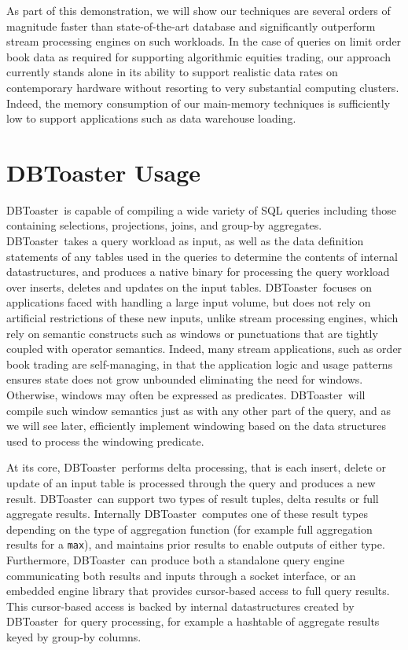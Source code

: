 \documentclass{vldb}
\newcommand{\compiler}{DBToaster}
\begin{document}
As part of this demonstration, we will show our techniques are several orders of
magnitude faster than state-of-the-art   database  and significantly outperform
stream processing engines on such workloads.  In the case of queries on limit
order  book  data  as  required for  supporting  algorithmic  equities trading,
our approach currently stands alone in its ability to support realistic  data
rates  on contemporary hardware without  resorting to very substantial computing
clusters. Indeed, the memory consumption of our main-memory techniques is
sufficiently low to support applications such as data warehouse loading.



\section{DBToaster Usage}

\compiler\ is capable of compiling a wide variety of SQL queries including those
containing selections, projections, joins, and group-by aggregates. \compiler\
takes a query workload as input, as well as the data definition statements of any
tables used in the queries to determine the contents of internal datastructures,
and produces a native binary for processing the query workload over inserts,
deletes and updates on the input tables. \compiler\ focuses on applications faced
with handling a large input volume, but does not rely on artificial restrictions
of these new inputs, unlike stream processing engines, which rely on semantic
constructs such as windows or punctuations that are tightly coupled with operator
semantics. Indeed, many stream applications, such as order book trading are
self-managing, in that the application logic and usage patterns ensures state
does not grow unbounded eliminating the need for windows. Otherwise, windows may
often be expressed as predicates. \compiler\ will compile such window semantics
just as with any other part of the query, and as we will see later, efficiently
implement windowing based on the data structures used to process the windowing
predicate.

At its core, \compiler\ performs delta processing, that is each insert, delete or
update of an input table is processed through the query and produces a new
result. \compiler\ can support two types of result tuples, delta results or full
aggregate results. Internally \compiler\ computes one of these result types
depending on the type of aggregation function (for example full aggregation
results for a \texttt{max}), and maintains prior results to enable outputs of
either type. Furthermore, \compiler\ can produce both a standalone query engine
communicating both results and inputs through a socket interface, or an embedded
engine library that provides cursor-based access to full query results. This
cursor-based access is backed by internal datastructures created by \compiler\
for query processing, for example a hashtable of aggregate results keyed by
group-by columns.
\end{document}
